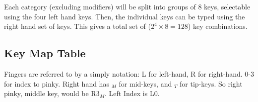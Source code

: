 \documentclass{article}
\begin{document}
Each category (excluding modifiers) will be split into groups of 8 keys, selectable using the four left hand keys. Then, the individual keys can be typed using the right hand set of keys. This gives a total set of ($2^4 \times 8 = 128$) key combinations.


\subsection{Key Map Table}

Fingers are referred to by a simply notation: L for left-hand, R for right-hand. 0-3 for index  to pinky. Right hand has $_M$ for mid-keys, and $_T$ for tip-keys. So right pinky, middle key, would be R3$_M$. Left Index is L0.
\end{document}
